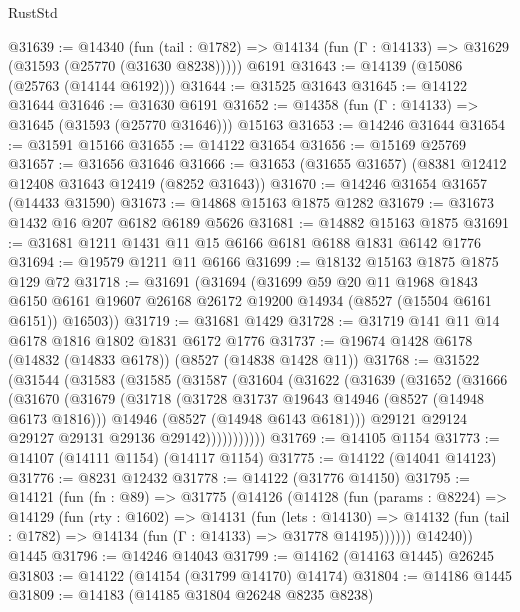 \begin{lexlean}{RustStd}
\begin{coremodule}
@31639 := @14340
    (fun (tail : @1782) => @14134 (fun (Γ : @14133) => @31629 (@31593 (@25770 (@31630 @8238)))))
    @6191
@31643 := @14139 (@15086 (@25763 (@14144 @6192)))
@31644 := @31525 @31643
@31645 := @14122 @31644
@31646 := @31630 @6191
@31652 := @14358 (fun (Γ : @14133) => @31645 (@31593 (@25770 @31646))) @15163
@31653 := @14246 @31644
@31654 := @31591 @15166
@31655 := @14122 @31654
@31656 := @15169 @25769
@31657 := @31656 @31646
@31666 := @31653 (@31655 @31657) (@8381 @12412 @12408 @31643 @12419 (@8252 @31643))
@31670 := @14246 @31654 @31657 (@14433 @31590)
@31673 := @14868 @15163 @1875 @1282
@31679 := @31673 @1432 @16 @207 @6182 @6189 @5626
@31681 := @14882 @15163 @1875
@31691 := @31681 @1211 @1431 @11 @15 @6166 @6181 @6188 @1831 @6142 @1776
@31694 := @19579 @1211 @11 @6166
@31699 := @18132 @15163 @1875 @1875 @129 @72
@31718 := @31691
    (@31694
      (@31699
        @59
        @20
        @11
        @1968
        @1843
        @6150
        @6161
        @19607
        @26168
        @26172
        @19200
        @14934
        (@8527 (@15504 @6161 @6151))
        @16503))
@31719 := @31681 @1429
@31728 := @31719 @141 @11 @14 @6178 @1816 @1802 @1831 @6172 @1776
@31737 := @19674 @1428 @6178 (@14832 (@14833 @6178)) (@8527 (@14838 @1428 @11))
@31768 := @31522
    (@31544
      (@31583
        (@31585
          (@31587
            (@31604
              (@31622
                (@31639
                  (@31652
                    (@31666
                      (@31670
                        (@31679
                          (@31718
                            (@31728 @31737 @19643 @14946 (@8527 (@14948 @6173 @1816)))
                            @14946
                            (@8527 (@14948 @6143 @6181)))
                          @29121
                          @29124
                          @29127
                          @29131
                          @29136
                          @29142)))))))))))
@31769 := @14105 @1154
@31773 := @14107 (@14111 @1154) (@14117 @1154)
@31775 := @14122 (@14041 @14123)
@31776 := @8231 @12432
@31778 := @14122 (@31776 @14150)
@31795 := @14121
    (fun (fn : @89) =>
    @31775
      (@14126
        (@14128
          (fun (params : @8224) =>
          @14129
            (fun (rty : @1602) =>
            @14131
              (fun (lets : @14130) =>
              @14132 (fun (tail : @1782) => @14134 (fun (Γ : @14133) => @31778 @14195))))))
        @14240))
    @1445
@31796 := @14246 @14043
@31799 := @14162 (@14163 @1445) @26245
@31803 := @14122 (@14154 (@31799 @14170) @14174)
@31804 := @14186 @1445
@31809 := @14183 (@14185 @31804 @26248 @8235 @8238)

\end{coremodule}
\end{lexlean}
